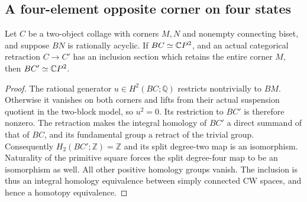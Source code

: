 \subsection{A four-element opposite corner on four states}

\begin{lemma}
\label{CP2:A-corner-retract-nonzero-restriction}
Let $C$ be a two-object collage with corners $M,N$ and
nonempty connecting biset, and suppose $BN$ is rationally
acyclic. If $BC\simeq\mathbb{C}P^2$, and an actual categorical
retraction $C\to C'$ has an inclusion section which retains
the entire corner $M$, then $BC'\simeq\mathbb{C}P^2$.
\end{lemma}
\begin{proof}
The rational generator $u\in H^2(BC;\mathbb Q)$ restricts
nontrivially to $BM$. Otherwise it vanishes on both corners
and lifts from their actual suspension quotient in the
two-block model, so $u^2=0$. Its restriction to $BC'$ is
therefore nonzero. The retraction makes the integral
homology of $BC'$ a direct summand of that of $BC$, and
its fundamental group a retract of the trivial group.
Consequently $H_2(BC';\mathbb Z)=\mathbb Z$ and its split
degree-two map is an isomorphism. Naturality of the primitive
square forces the split degree-four map to be an isomorphism
as well. All other positive homology groups vanish. The
inclusion is thus an integral homology equivalence between
simply connected CW spaces, and hence a homotopy equivalence.
\end{proof}

